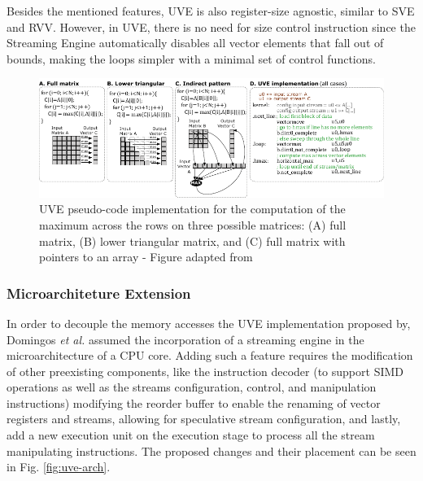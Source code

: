 Besides the mentioned features, UVE is also register-size agnostic, similar to SVE and RVV. However, in UVE, there is no need for size control instruction since the Streaming Engine automatically disables all vector elements that fall out of bounds, making the loops simpler with a minimal set of control functions.


\begin{figure}[H]
	\begin{center}
 		\includegraphics[width=.9\linewidth]{images/UVE-pseudo-code.pdf}
 		\caption{UVE pseudo-code implementation for the computation of the maximum
across the rows on three possible matrices: (A) full matrix, (B) lower triangular
matrix, and (C) full matrix with pointers to an array - Figure adapted from \cite{uve-paper}}
 		\label{fig:uve-mem-access}
	\end{center} 
\end{figure}


\subsubsection{Microarchiteture Extension}

In order to decouple the memory accesses the \acrshort{UVE} implementation proposed by, Domingos \textit{et al.} \cite{uve-paper} assumed the incorporation of a streaming engine in the microarchitecture of a CPU core. Adding such a feature requires the modification of other preexisting components, like the instruction decoder (to support SIMD operations as well as the streams configuration, control, and manipulation instructions)  modifying the reorder buffer to enable the renaming of vector registers and streams, allowing for speculative stream configuration, and lastly, add a new execution unit on the execution stage to process all the stream manipulating instructions. The proposed changes and their placement can be seen in Fig. \ref{fig:uve-arch}.

